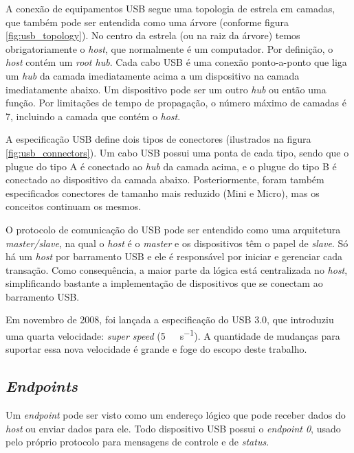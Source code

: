 \documentclass[brazil,pagestart=firstchapter]{abnt}
\begin{document}
A conexão de equipamentos \ac{USB} segue uma topologia de estrela em
camadas, que também pode ser entendida como uma árvore (conforme figura
\ref{fig:usb_topology}). No centro da estrela (ou na raiz da árvore) temos
obrigatoriamente o \textit{host}, que normalmente é um computador. Por
definição, o \textit{host} contém um \textit{root hub}. Cada cabo \ac{USB} é
uma conexão ponto-a-ponto que liga um \textit{hub} da camada imediatamente
acima a um dispositivo na camada imediatamente abaixo. Um dispositivo pode
ser um outro \textit{hub} ou então uma função. Por limitações de tempo de
propagação, o número máximo de camadas é 7, incluindo a camada que contém o
\textit{host}.  \cite[p.~16]{usb20}

A especificação \ac{USB} define dois tipos de conectores (ilustrados na
figura \ref{fig:usb_connectors}). Um cabo \ac{USB} possui uma ponta de cada
tipo, sendo que o plugue do tipo A é conectado ao \textit{hub} da camada
acima, e o plugue do tipo B é conectado ao dispositivo da camada abaixo.
Posteriormente, foram também especificados conectores de tamanho mais
reduzido (Mini e Micro), mas os conceitos continuam os mesmos.

O protocolo de comunicação do \ac{USB} pode ser entendido como uma
arquitetura \textit{master/slave}, na qual o \textit{host} é o
\textit{master} e os dispositivos têm o papel de \textit{slave}. Só há um
\textit{host} por barramento \ac{USB} e ele é responsável por iniciar e
gerenciar cada transação. Como consequência, a maior parte da lógica está
centralizada no \textit{host}, simplificando bastante a implementação de
dispositivos que se conectam ao barramento \ac{USB}. \cite{usbinanutshell}

Em novembro de 2008, foi lançada a especificação do USB 3.0, que introduziu
uma quarta velocidade: \textit{super speed} (\SI{5}{\giga\bit\per\second}).
A quantidade de mudanças para suportar essa nova velocidade é grande e foge
do escopo deste trabalho.


\subsection{\textit{Endpoints}}
\label{sub:usb_endpoints}

Um \textit{endpoint} pode ser visto como um endereço lógico que pode receber
dados do \textit{host} ou enviar dados para ele. Todo dispositivo \ac{USB}
possui o \textit{endpoint 0}, usado pelo próprio protocolo para mensagens de
controle e de \textit{status}. \cite[cap.~3]{usbinanutshell}
\end{document}
